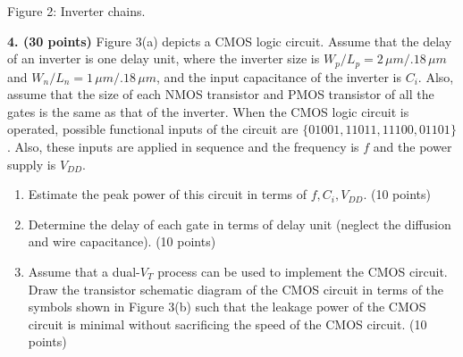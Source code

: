 \documentclass[10pt]{article}
\newcommand{\mos}[4]{\begin{scope}[shift={(#1,#2)}]
\draw(0,.23)--(0,-.23);\draw(0,.2)--(.25,.2)--(.25,.5);\draw(0,-.2)--(.25,-.2)--(.25,-.5);
\draw(-.16,.23)--(-.16,-.23);
\ifnum#4=1\draw(-.26,0)circle(.06);\draw(-.7,0)--(-.32,0);\else\draw(-.7,0)--(-.16,0);\fi
\node[anchor=east,font=\scriptsize]at(-.71,0){$#3$};\end{scope}}
\newcommand{\grd}[2]{\draw(#1,#2)--(#1,#2-.12);\draw(#1-.15,#2-.12)--(#1+.15,#2-.12);\draw(#1-.1,#2-.19)--(#1+.1,#2-.19);}
\begin{document}
\begin{center}
\end{center}\begin{center}Figure 2: Inverter chains.\end{center}
\newpage
\textbf{4. (30 points)} Figure 3(a) depicts a CMOS logic circuit. Assume that the delay of an inverter is one delay unit, where the inverter size is $W_p/L_p=2\,\mu m/.18\,\mu m$ and $W_n/L_n=1\,\mu m/.18\,\mu m$, and the input capacitance of the inverter is $C_i$. Also, assume that the size of each NMOS transistor and PMOS transistor of all the gates is the same as that of the inverter. When the CMOS logic circuit is operated, possible functional inputs of the circuit are $\{01001,11011,11100,01101\}$. Also, these inputs are applied in sequence and the frequency is $f$ and the power supply is $V_{DD}$.
\begin{enumerate}[label=(\alph*),leftmargin=7mm]
\item Estimate the peak power of this circuit in terms of $f,C_i,V_{DD}$. (10 points)
\item Determine the delay of each gate in terms of delay unit (neglect the diffusion and wire capacitance). (10 points)
\item Assume that a dual-$V_T$ process can be used to implement the CMOS circuit. Draw the transistor schematic diagram of the CMOS circuit in terms of the symbols shown in Figure 3(b) such that the leakage power of the CMOS circuit is minimal without sacrificing the speed of the CMOS circuit. (10 points)
\end{enumerate}
\end{document}
